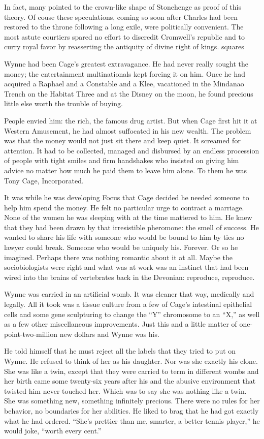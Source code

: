 In fact, many pointed to the crown-like shape of Stonehenge as proof of this theory. Of couse these speculations, coming so soon after Charles had been restored to the throne following a long exile, were politically convenient. The most astute courtiers spared no effort to discredit Cromwell’s republic and to curry royal favor by reasserting the antiquity of divine right of kings.
squares

Wynne had been Cage’s greatest extravagance. He had never really sought the money; the entertainment multinationals kept forcing it on him. Once he had acquired a Raphael and a Constable and a Klee, vacationed in the Mindanao Trench on the Habitat Three and at the Disney on the moon, he found precious little else worth the trouble of buying.

People envied him: the rich, the famous drug artist. But when Cage first hit it at Western Amusement, he had almost suffocated in his new wealth. The problem was that the money would not just sit there and keep quiet. It screamed for attention. It had to be collected, managed and disbursed by an endless procession of people with tight smiles and firm handshakes who insisted on giving him advice no matter how much he paid them to leave him alone. To them he was Tony Cage, Incorporated.

It was while he was developing Focus that Cage decided he needed someone to help him spend the money. He felt no particular urge to contract a marriage. None of the women he was sleeping with at the time mattered to him. He knew that they had been drawn by that irresistible pheromone: the smell of success. He wanted to share his life with someone who would be bound to him by ties no lawyer could break. Someone who would be uniquely his. Forever. Or so he imagined. Perhaps there was nothing romantic about it at all. Maybe the sociobiologists were right and what was at work was an instinct that had been wired into the brains of vertebrates back in the Devonian: reproduce, reproduce.

Wynne was carried in an artificial womb. It was cleaner that way, medically and legally. All it took was a tissue culture from a few of Cage’s intestinal epithelial cells and some gene sculpturing to change the “Y” chromosome to an “X,” as well as a few other miscellaneous improvements. Just this and a little matter of one-point-two-million new dollars and Wynne was his.

He told himself that he must reject all the labels that they tried to put on Wynne. He refused to think of her as his daughter. Nor was she exactly his clone. She was like a twin, except that they were carried to term in different wombs and her birth came some twenty-six years after his and the abusive environment that twisted him never touched her. Which was to say she was nothing like a twin. She was something new, something infinitely precious. There were no rules for her behavior, no boundaries for her abilities. He liked to brag that he had got exactly what he had ordered. “She’s prettier than me, smarter, a better tennis player,” he would joke, “worth every cent.”

